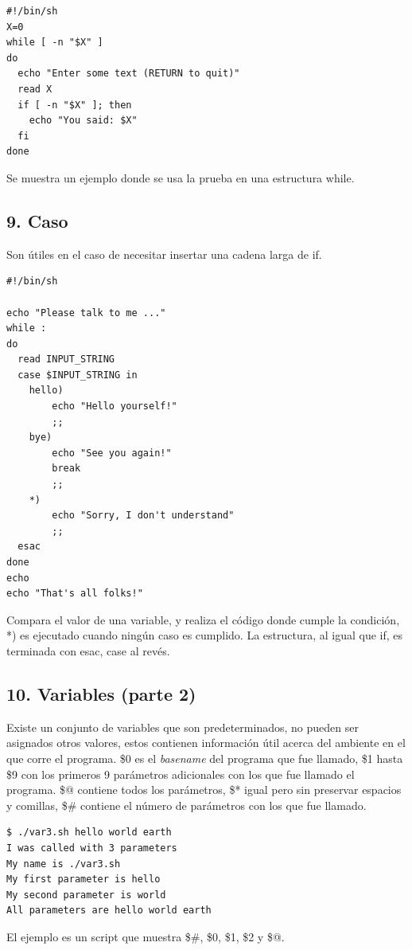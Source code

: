\documentclass[a4paper]{article}
\begin{document}
\begin{verbatim}
#!/bin/sh
X=0
while [ -n "$X" ]
do
  echo "Enter some text (RETURN to quit)"
  read X
  if [ -n "$X" ]; then
    echo "You said: $X"
  fi
done
\end{verbatim}

Se muestra un ejemplo donde se usa la prueba en una estructura while.

\subsection*{9. Caso}

Son útiles en el caso de necesitar insertar una cadena larga de if.

\begin{verbatim}
#!/bin/sh

echo "Please talk to me ..."
while :
do
  read INPUT_STRING
  case $INPUT_STRING in
	hello)
		echo "Hello yourself!"
		;;
	bye)
		echo "See you again!"
		break
		;;
	*)
		echo "Sorry, I don't understand"
		;;
  esac
done
echo 
echo "That's all folks!"
\end{verbatim}

Compara el valor de una variable, y realiza el código donde cumple la condición, *) es ejecutado cuando ningún caso es cumplido. La estructura, al igual que if, es terminada con esac, case al revés.

\subsection*{10. Variables (parte 2)}

Existe un conjunto de variables que son predeterminados, no pueden ser asignados otros valores, estos contienen información útil acerca del ambiente en el que corre el programa. \$0 es el \textit{basename} del programa que fue llamado, \$1 hasta \$9 con los primeros 9 parámetros adicionales con los que fue llamado el programa. \$@ contiene todos los parámetros, \$* igual pero sin preservar espacios y comillas, \$\# contiene el número de parámetros con los que fue llamado.

\begin{verbatim}
$ ./var3.sh hello world earth
I was called with 3 parameters
My name is ./var3.sh
My first parameter is hello
My second parameter is world
All parameters are hello world earth
\end{verbatim}

El ejemplo es un script que muestra \$\#, \$0, \$1, \$2 y \$@.
\end{document}
